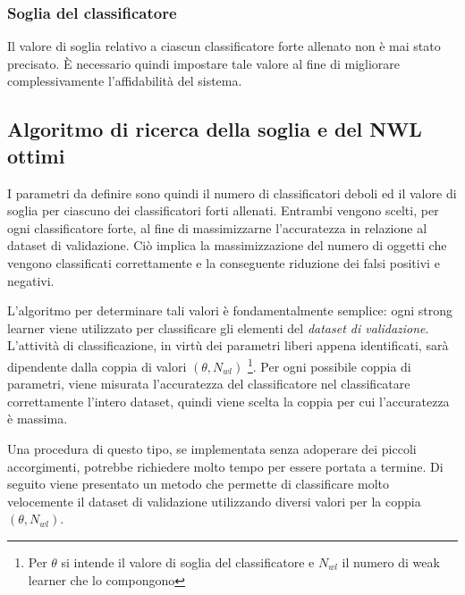             \subsubsection{Soglia del classificatore}
                Il valore di soglia relativo a ciascun classificatore forte allenato non è mai stato precisato.
                È necessario quindi impostare tale valore al fine di migliorare complessivamente l'affidabilità del sistema.

        \subsection{Algoritmo di ricerca della soglia e del NWL ottimi}
            I parametri da definire sono quindi il numero di classificatori deboli ed il valore di soglia per ciascuno dei classificatori forti allenati.
            Entrambi vengono scelti, per ogni classificatore forte, al fine di massimizzarne l'accuratezza in relazione al dataset di validazione.
            Ciò implica la massimizzazione del numero di oggetti che vengono classificati correttamente e la conseguente riduzione dei falsi positivi e negativi.

            L'algoritmo per determinare tali valori è fondamentalmente semplice: ogni strong learner viene utilizzato per classificare gli elementi del \emph{dataset di validazione}.
            L'attività di classificazione, in virtù dei parametri liberi appena identificati, sarà dipendente dalla coppia di valori $(\theta, N_{wl})$ \footnote{Per $\theta$ si intende il valore di soglia del classificatore e $N_{wl}$ il numero di weak learner che lo compongono}.
            Per ogni possibile coppia di parametri, viene misurata l'accuratezza del classificatore nel classificatare correttamente l'intero dataset, quindi viene scelta la coppia per cui l'accuratezza è massima.

            Una procedura di questo tipo, se implementata senza adoperare dei piccoli accorgimenti, potrebbe richiedere molto tempo per essere portata a termine.
            Di seguito viene presentato un metodo che permette di classificare molto velocemente il dataset di validazione utilizzando diversi valori per la coppia $(\theta, N_{wl})$.

